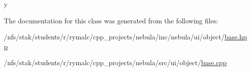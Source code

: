 y 

The documentation for this class was generated from the following files:\begin{DoxyCompactItemize}
\item 
/nfs/stak/students/r/rymalc/cpp\_\-projects/nebula/inc/nebula/ui/object/\hyperlink{inc_2nebula_2ui_2object_2base_8hpp}{base.hpp}\item 
/nfs/stak/students/r/rymalc/cpp\_\-projects/nebula/src/ui/object/\hyperlink{src_2ui_2object_2base_8cpp}{base.cpp}\end{DoxyCompactItemize}
